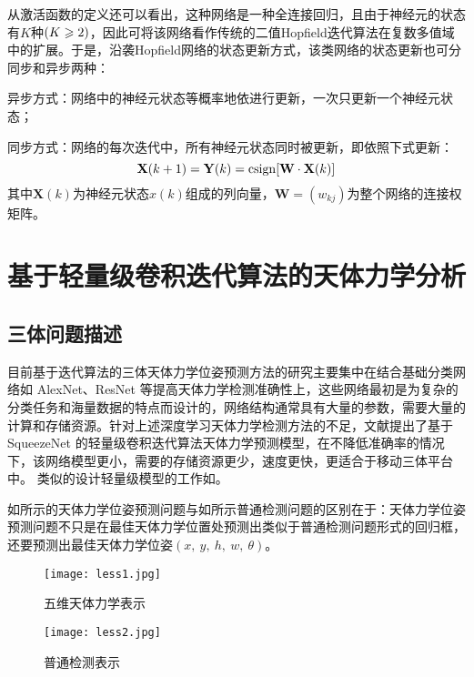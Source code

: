 \documentclass{dmuthesis}
\begin{document}
从激活函数的定义还可以看出，这种网络是一种全连接回归，且由于神经元的状态有$K$种$(K\geqslant2)$，因此可将该网络看作传统的二值Hopf\/ield迭代算法在复数多值域中的扩展。于是，沿袭Hopf\/ield网络的状态更新方式，该类网络的状态更新也可分同步和异步两种：

异步方式：网络中的神经元状态等概率地依进行更新，一次只更新一个神经元状态；

同步方式：网络的每次迭代中，所有神经元状态同时被更新，即依照下式更新：\begin{equation}
{\mathbf{ X}}(k+1)=\mathbf{ Y}(k)=\operatorname{csign}[\mathbf{ W }\cdot\mathbf{ X }(k)]               
\end{equation}
其中$\mathbf{ X}(k)$为神经元状态$x(k)$组成的列向量，$\mathbf{ W}=(w_{kj})$为整个网络的连接权矩阵。

\section{基于轻量级卷积迭代算法的天体力学分析}

\subsection{三体问题描述}

目前基于迭代算法的三体天体力学位姿预测方法的研究主要集中在结合基础分类网络如 AlexNet、ResNet 等提高天体力学检测准确性上，这些网络最初是为复杂的分类任务和海量数据的特点而设计的，网络结构通常具有大量的参数，需要大量的计算和存储资源。针对上述深度学习天体力学检测方法的不足，文献\cite{bib:one}提出了基于 SqueezeNet 的轻量级卷积迭代算法天体力学预测模型，在不降低准确率的情况下，该网络模型更小，需要的存储资源更少，速度更快，更适合于移动三体平台中。 类似的设计轻量级模型的工作如\cite{bib11}。

如所示的天体力学位姿预测问题与如所示普通检测问题的区别在于：天体力学位姿预测问题不只是在最佳天体力学位置处预测出类似于普通检测问题形式的回归框，还要预测出最佳天体力学位姿$(x,\ y,\ h,\ w,\ \theta)$。

\begin{figure}[!htbp]
	\centering
	\texttt{[image: less1.jpg]}
	\caption{五维天体力学表示}
     \label{figless1}
\end{figure}
\begin{figure}[!htbp]
	\centering
	\texttt{[image: less2.jpg]}
	\caption{普通检测表示}
     \label{figless2}
\end{figure}
\end{document}
